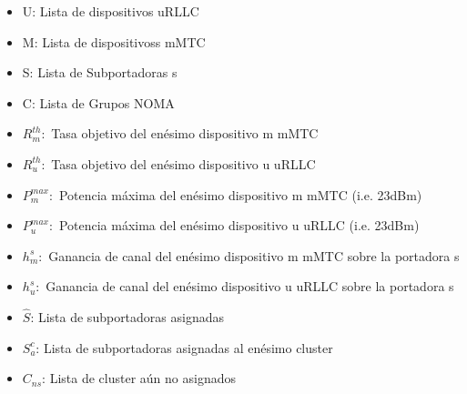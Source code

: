 \begin{itemize}
    \item U: Lista de dispositivos uRLLC
    \item M: Lista de dispositivoss mMTC
    \item S: Lista de Subportadoras s
    \item C: Lista de Grupos NOMA
    \item $R_{m}^{th}:$ Tasa objetivo del enésimo dispositivo m mMTC 
    \item $R_{u}^{th}:$ Tasa objetivo del enésimo dispositivo u uRLLC
    \item $P_{m}^{max}:$ Potencia máxima del enésimo dispositivo m mMTC (i.e. 23dBm)
    \item $P_{u}^{max}:$ Potencia máxima del enésimo dispositivo u uRLLC (i.e. 23dBm)
    \item $h_{m}^{s}:$ Ganancia de canal del enésimo dispositivo m mMTC sobre la portadora s
    \item $h_{u}^{s}:$ Ganancia de canal del enésimo dispositivo u uRLLC sobre la portadora s
    \item ${\hat S}$: Lista de subportadoras asignadas
    \item $S_{a}^{c}$: Lista de subportadoras asignadas al enésimo cluster
    \item ${C_{ns}}$: Lista de cluster aún no asignados
\end{itemize}


\makeatletter
\def\algbackskip{\hskip-\ALG@thistlm}
\makeatother

